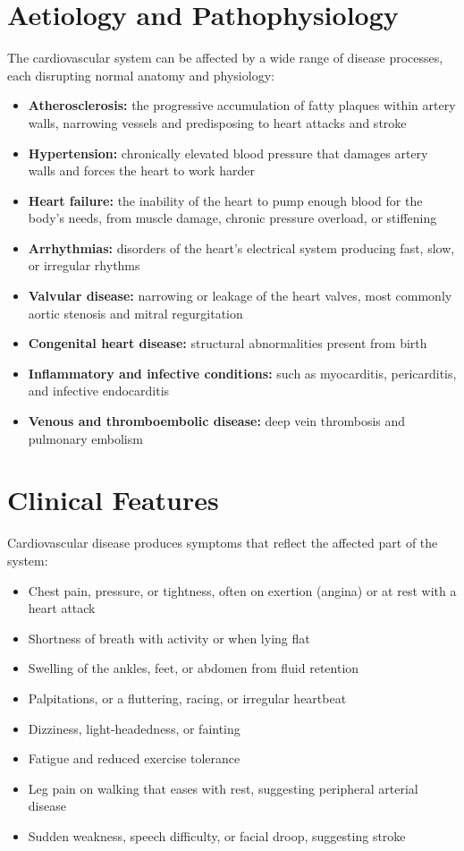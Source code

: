 \section*{Aetiology and Pathophysiology}
The cardiovascular system can be affected by a wide range of disease processes, each disrupting normal anatomy and physiology:
\begin{itemize}
    \item \textbf{Atherosclerosis:} the progressive accumulation of fatty plaques within artery walls, narrowing vessels and predisposing to heart attacks and stroke
    \item \textbf{Hypertension:} chronically elevated blood pressure that damages artery walls and forces the heart to work harder
    \item \textbf{Heart failure:} the inability of the heart to pump enough blood for the body's needs, from muscle damage, chronic pressure overload, or stiffening
    \item \textbf{Arrhythmias:} disorders of the heart's electrical system producing fast, slow, or irregular rhythms
    \item \textbf{Valvular disease:} narrowing or leakage of the heart valves, most commonly aortic stenosis and mitral regurgitation
    \item \textbf{Congenital heart disease:} structural abnormalities present from birth
    \item \textbf{Inflammatory and infective conditions:} such as myocarditis, pericarditis, and infective endocarditis
    \item \textbf{Venous and thromboembolic disease:} deep vein thrombosis and pulmonary embolism
\end{itemize}

\section*{Clinical Features}
Cardiovascular disease produces symptoms that reflect the affected part of the system:
\begin{itemize}
    \item Chest pain, pressure, or tightness, often on exertion (angina) or at rest with a heart attack
    \item Shortness of breath with activity or when lying flat
    \item Swelling of the ankles, feet, or abdomen from fluid retention
    \item Palpitations, or a fluttering, racing, or irregular heartbeat
    \item Dizziness, light-headedness, or fainting
    \item Fatigue and reduced exercise tolerance
    \item Leg pain on walking that eases with rest, suggesting peripheral arterial disease
    \item Sudden weakness, speech difficulty, or facial droop, suggesting stroke
\end{itemize}

